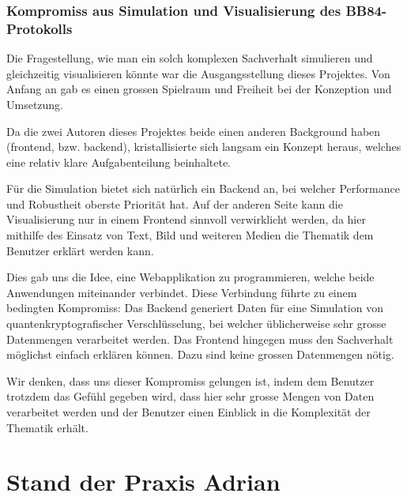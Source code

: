 \documentclass[a4paper,10.2pt,pdftex]{scrartcl}%
\begin{document}
\subsubsection{Kompromiss aus Simulation und Visualisierung des BB84-Protokolls}
Die Fragestellung, wie man ein solch komplexen Sachverhalt simulieren und gleichzeitig visualisieren könnte war die Ausgangsstellung dieses Projektes. Von Anfang an gab es einen grossen Spielraum und Freiheit bei der Konzeption und Umsetzung.

Da die zwei Autoren dieses Projektes beide einen anderen Background haben (frontend, bzw. backend), kristallisierte sich langsam ein Konzept heraus, welches eine relativ klare Aufgabenteilung beinhaltete.

Für die Simulation bietet sich natürlich ein Backend an, bei welcher Performance und Robustheit oberste Priorität hat. Auf der anderen Seite kann die Visualisierung nur in einem Frontend sinnvoll verwirklicht werden, da hier mithilfe des Einsatz von Text, Bild und weiteren Medien die Thematik dem Benutzer erklärt werden kann.

Dies gab uns die Idee, eine Webapplikation zu programmieren, welche beide Anwendungen miteinander verbindet. Diese Verbindung führte zu einem bedingten Kompromiss: Das Backend generiert Daten für eine Simulation von quantenkryptografischer Verschlüsselung, bei welcher üblicherweise sehr grosse Datenmengen verarbeitet werden. Das Frontend hingegen muss den Sachverhalt möglichst einfach erklären können. Dazu sind keine grossen Datenmengen nötig.

Wir denken, dass uns dieser Kompromiss gelungen ist, indem dem Benutzer trotzdem das Gefühl gegeben wird, dass hier sehr grosse Mengen von Daten verarbeitet werden und der Benutzer einen Einblick in die Komplexität der Thematik erhält.
 
 



\section{Stand der Praxis Adrian}
\end{document}
